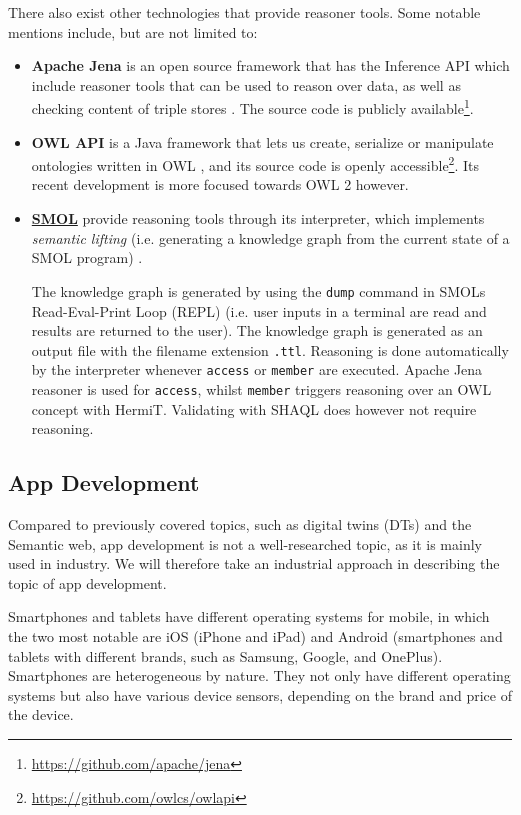 \documentclass{article}
\begin{document}
There also exist other technologies that provide reasoner tools. Some notable mentions include, but are not limited to:
\begin{itemize}
    \item{\textbf{Apache Jena}} is an open source framework that has the Inference API which include reasoner tools that can be used to reason over data, as well as checking content of triple stores \cite{noauthor_apache_nodate-1}. The source code is publicly available\footnote{\url{https://github.com/apache/jena}}.
    \item{\textbf{OWL API}} is a Java framework that lets us create, serialize or manipulate ontologies written in OWL \cite{noauthor_owl_nodate}, and its source code is openly accessible\footnote{\url{https://github.com/owlcs/owlapi}}. Its recent development is more focused towards OWL 2 however.
    \item\hyperref[subsec:SMOL]{\textbf{SMOL}} provide reasoning tools through its interpreter, which implements \emph{semantic lifting} (i.e. generating a knowledge graph from the current state of a SMOL program) \cite{noauthor_semantic_nodate}. 
    
    The knowledge graph is generated by using the \verb|dump| command in SMOLs Read-Eval-Print Loop (REPL) (i.e. user inputs in a terminal are read and results are returned to the user). The knowledge graph is generated as an output file with the filename extension \verb|.ttl|. Reasoning is done automatically by the interpreter whenever \verb|access| or \verb|member| are executed. Apache Jena reasoner is used for \verb|access|, whilst \verb|member| triggers reasoning over an OWL concept with HermiT. Validating with SHAQL does however not require reasoning.
\end{itemize}



\subsection{App Development}\label{subsec:AppDevelopment}
Compared to previously covered topics, such as digital twins (DTs) and the Semantic web, app development is not a well-researched topic, as it is mainly used in industry. We will therefore take an industrial approach in describing the topic of app development.

Smartphones and tablets have different operating systems for mobile, in which the two most notable are iOS (iPhone and iPad) and Android (smartphones and tablets with different brands, such as Samsung, Google, and OnePlus). Smartphones are heterogeneous by nature. They not only have different operating systems but also have various device sensors, depending on the brand and price of the device. 
\end{document}
